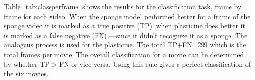 \documentclass[journal]{IEEEtran}
\newcommand{\tref}[1]{Table~\ref{#1}}
\begin{document}
% 

\tref{tab:classperframe} shows the results for the classification task, frame by frame for each video.  When the sponge model performed better for a frame of the sponge video it is marked as a true positive (TP), when plasticine does better it is marked as a false negative (FN) ---since it didn't recognize it as a sponge.  The analogous process is used for the plasticine. The total TP+FN=299 which is the total frames per movie. The overall classification for a movie can be determined by whether TP > FN or vice versa. Using this rule gives a perfect classification of the six movies.
\end{document}
